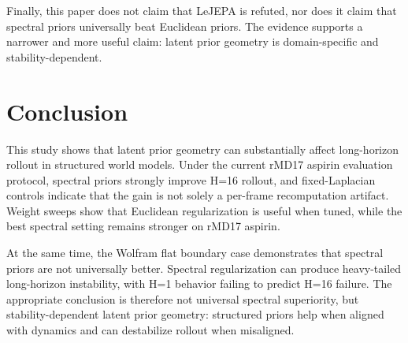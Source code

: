 \documentclass[pdflatex,sn-mathphys-num]{sn-jnl}
\begin{document}
Finally, this paper does not claim that LeJEPA is refuted, nor does it claim that spectral priors universally beat Euclidean priors. The evidence supports a narrower and more useful claim: latent prior geometry is domain-specific and stability-dependent.

\section{Conclusion}

This study shows that latent prior geometry can substantially affect long-horizon rollout in structured world models. Under the current rMD17 aspirin evaluation protocol, spectral priors strongly improve H=16 rollout, and fixed-Laplacian controls indicate that the gain is not solely a per-frame recomputation artifact. Weight sweeps show that Euclidean regularization is useful when tuned, while the best spectral setting remains stronger on rMD17 aspirin.

At the same time, the Wolfram flat boundary case demonstrates that spectral priors are not universally better. Spectral regularization can produce heavy-tailed long-horizon instability, with H=1 behavior failing to predict H=16 failure. The appropriate conclusion is therefore not universal spectral superiority, but stability-dependent latent prior geometry: structured priors help when aligned with dynamics and can destabilize rollout when misaligned.



\end{document}
